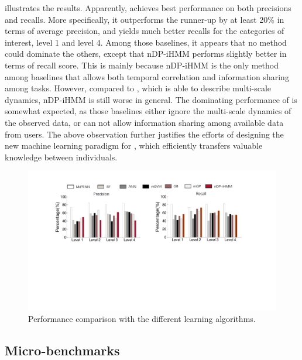  illustrates the results.
Apparently, \modelname achieves best performance on both precisions and recalls.
More specifically, it outperforms the runner-up by at least 20\% in terms of average precision, and yields much better recalls for the categories of interest, \ie level 1 and level 4.
Among those baselines, it appears that no method could dominate the others, except that nDP-iHMM performs slightly better in terms of recall score.
This is mainly because nDP-iHMM is the only method among baselines that allows both temporal correlation and information sharing among tasks.
However, compared to \modelname, which is able to describe multi-scale dynamics, nDP-iHMM is still worse in general.
The dominating performance of \modelname is somewhat expected, as those baselines either ignore the multi-scale dynamics of the observed data, or can not allow information sharing among available data from users.
The above observation further justifies the efforts of designing the new machine learning paradigm for \sysname, which efficiently transfers valuable knowledge between individuals.
\begin{figure}[h]
  \centering
  \includegraphics[width=0.9\columnwidth]{./img/Model_CMP1.pdf}
  \caption{Performance comparison with the different learning algorithms.}
  \label{fig:cmp_models}
\end{figure}





\subsection{Micro-benchmarks}
